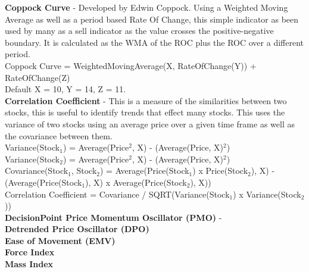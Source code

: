 \documentclass[12pt,a4paper]{article}
\begin{document}
\iffalse
[]
\fi

\textbf{Coppock Curve} - Developed by Edwin Coppock. Using a Weighted Moving Average as well as a period based Rate Of Change, this simple indicator as been used by many as a sell indicator as the value crosses the positive-negative boundary. It is calculated as the WMA of the ROC plus the ROC over a different period.\\

Coppock Curve = WeightedMovingAverage(X, RateOfChange(Y)) + RateOfChange(Z)\\
Default X = 10, Y = 14, Z = 11. \\

\iffalse
[]
\fi

\textbf{Correlation Coefficient} - This is a measure of the similarities between two stocks, this is useful to identify trends that effect many stocks. This uses the variance of two stocks using an average price over a given time frame as well as the covariance between them.\\

Variance(Stock$_1$) = Average(Price$^2$, X) - (Average(Price, X)$^2$)\\
Variance(Stock$_2$) = Average(Price$^2$, X) - (Average(Price, X)$^2$)\\
Covariance(Stock$_1$, Stock$_2$) = Average(Price(Stock$_1$) x Price(Stock$_2$), X) - (Average(Price(Stock$_1$), X) x Average(Price(Stock$_2$), X))\\
Correlation Coefficient = Covariance / SQRT(Variance(Stock$_1$) x Variance(Stock$_2$))\\

\iffalse
[]
\fi

\textbf{DecisionPoint Price Momentum Oscillator (PMO)} - \\

\iffalse
[]
\fi

\textbf{Detrended Price Oscillator (DPO)} \\

\iffalse
[]
\fi

\textbf{Ease of Movement (EMV)} \\

\iffalse
[]
\fi

\textbf{Force Index} \\

\iffalse
[]
\fi

\textbf{Mass Index} \\

\iffalse
[]
\fi
\end{document}
